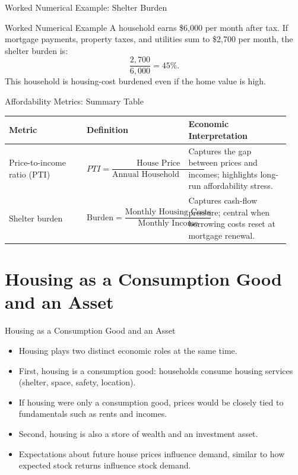 \documentclass[aspectratio=169]{beamer}
\begin{document}
\begin{frame}{Worked Numerical Example: Shelter Burden}
\transfade
\begin{block}{Worked Numerical Example}
A household earns \$6{,}000 per month after tax. If mortgage payments, property taxes, and utilities sum to \$2{,}700 per month, the shelter burden is:
\[
\frac{2{,}700}{6{,}000} = 45\%.
\]
This household is housing-cost burdened even if the home value is high.
\end{block}
\end{frame}

\begin{frame}{Affordability Metrics: Summary Table}
\transfade
\begin{center}
\small
\setlength{\tabcolsep}{4pt}
\renewcommand{\arraystretch}{1.2}
\begin{tabular}{p{0.26\linewidth} p{0.34\linewidth} p{0.34\linewidth}}
\toprule
\textbf{Metric} & \textbf{Definition} & \textbf{Economic Interpretation} \\
\midrule
Price-to-income ratio (PTI) &
$PTI=\dfrac{\text{House Price}}{\text{Annual Household Income}}$ &
Captures the gap between prices and incomes; highlights long-run affordability stress. \\
\addlinespace[0.4em]
Shelter burden &
$\text{Burden}=\dfrac{\text{Monthly Housing Costs}}{\text{Monthly Income}}$ &
Captures cash-flow pressure; central when borrowing costs reset at mortgage renewal. \\
\bottomrule
\end{tabular}
\end{center}
\end{frame}

\section{Housing as a Consumption Good and an Asset}

\begin{frame}{Housing as a Consumption Good and an Asset}
\transfade
\begin{itemize}
  \item Housing plays two distinct economic roles at the same time.
  \item First, housing is a consumption good: households consume housing services (shelter, space, safety, location).
  \item If housing were only a consumption good, prices would be closely tied to fundamentals such as rents and incomes.
  \item Second, housing is also a store of wealth and an investment asset.
  \item Expectations about future house prices influence demand, similar to how expected stock returns influence stock demand.
\end{itemize}
\end{frame}
\end{document}

